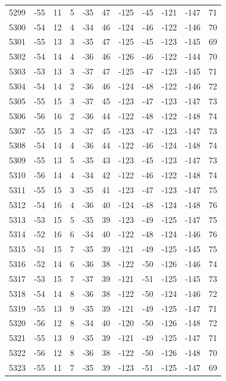 \begin{table}[H]
\begin{tabular}{lllllllllll}
5299 & -55 & 11 & 5 & -35 & 47 & -125 & -45 & -121 & -147 & 71 \\
5300 & -54 & 12 & 4 & -34 & 46 & -124 & -46 & -122 & -146 & 70 \\
5301 & -55 & 13 & 3 & -35 & 47 & -125 & -45 & -123 & -145 & 69 \\
5302 & -54 & 14 & 4 & -36 & 46 & -126 & -46 & -122 & -144 & 70 \\
5303 & -53 & 13 & 3 & -37 & 47 & -125 & -47 & -123 & -145 & 71 \\
5304 & -54 & 14 & 2 & -36 & 46 & -124 & -48 & -122 & -146 & 72 \\
5305 & -55 & 15 & 3 & -37 & 45 & -123 & -47 & -123 & -147 & 73 \\
5306 & -56 & 16 & 2 & -36 & 44 & -122 & -48 & -122 & -148 & 74 \\
5307 & -55 & 15 & 3 & -37 & 45 & -123 & -47 & -123 & -147 & 73 \\
5308 & -54 & 14 & 4 & -36 & 44 & -122 & -46 & -124 & -148 & 74 \\
5309 & -55 & 13 & 5 & -35 & 43 & -123 & -45 & -123 & -147 & 73 \\
5310 & -56 & 14 & 4 & -34 & 42 & -122 & -46 & -122 & -148 & 74 \\
5311 & -55 & 15 & 3 & -35 & 41 & -123 & -47 & -123 & -147 & 75 \\
5312 & -54 & 16 & 4 & -36 & 40 & -124 & -48 & -124 & -148 & 76 \\
5313 & -53 & 15 & 5 & -35 & 39 & -123 & -49 & -125 & -147 & 75 \\
5314 & -52 & 16 & 6 & -34 & 40 & -122 & -48 & -124 & -146 & 76 \\
5315 & -51 & 15 & 7 & -35 & 39 & -121 & -49 & -125 & -145 & 75 \\
5316 & -52 & 14 & 6 & -36 & 38 & -122 & -50 & -126 & -146 & 74 \\
5317 & -53 & 15 & 7 & -37 & 39 & -121 & -51 & -125 & -145 & 73 \\
5318 & -54 & 14 & 8 & -36 & 38 & -122 & -50 & -124 & -146 & 72 \\
5319 & -55 & 13 & 9 & -35 & 39 & -121 & -49 & -125 & -147 & 71 \\
5320 & -56 & 12 & 8 & -34 & 40 & -120 & -50 & -126 & -148 & 72 \\
5321 & -55 & 13 & 9 & -35 & 39 & -121 & -49 & -125 & -147 & 71 \\
5322 & -56 & 12 & 8 & -36 & 38 & -122 & -50 & -126 & -148 & 70 \\
5323 & -55 & 11 & 7 & -35 & 39 & -123 & -51 & -125 & -147 & 69 \\

\end{tabular}
\end{table}
